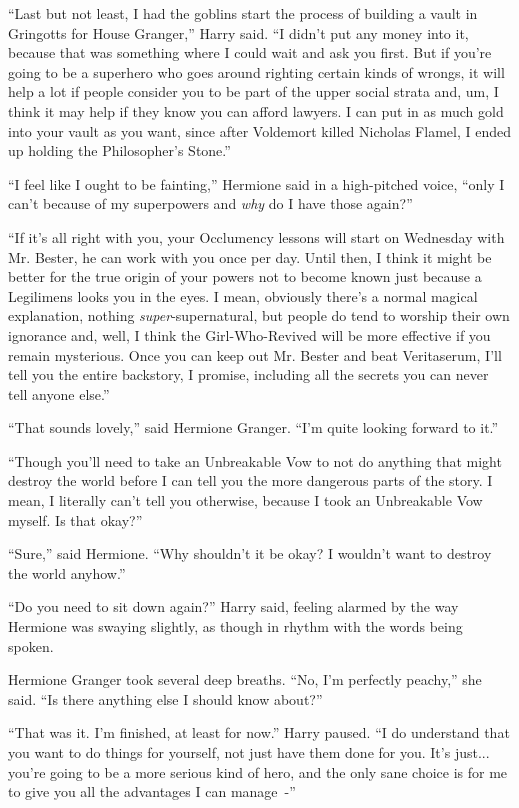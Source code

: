 ``Last but not least, I had the goblins start the process of building a vault in Gringotts for House Granger,'' Harry said. ``I didn't put any money into it, because that was something where I could wait and ask you first. But if you're going to be a superhero who goes around righting certain kinds of wrongs, it will help a lot if people consider you to be part of the upper social strata and, um, I think it may help if they know you can afford lawyers. I can put in as much gold into your vault as you want, since after Voldemort killed Nicholas Flamel, I ended up holding the Philosopher's Stone.''

``I feel like I ought to be fainting,'' Hermione said in a high-pitched voice, ``only I can't because of my superpowers and \emph{why} do I have those again?''

``If it's all right with you, your Occlumency lessons will start on Wednesday with Mr. Bester, he can work with you once per day. Until then, I think it might be better for the true origin of your powers not to become known just because a Legilimens looks you in the eyes. I mean, obviously there's a normal magical explanation, nothing \emph{super}-supernatural, but people do tend to worship their own ignorance and, well, I think the Girl-Who-Revived will be more effective if you remain mysterious. Once you can keep out Mr. Bester and beat Veritaserum, I'll tell you the entire backstory, I promise, including all the secrets you can never tell anyone else.''

``That sounds lovely,'' said Hermione Granger. ``I'm quite looking forward to it.''

``Though you'll need to take an Unbreakable Vow to not do anything that might destroy the world before I can tell you the more dangerous parts of the story. I mean, I literally can't tell you otherwise, because I took an Unbreakable Vow myself. Is that okay?''

``Sure,'' said Hermione. ``Why shouldn't it be okay? I wouldn't want to destroy the world anyhow.''

``Do you need to sit down again?'' Harry said, feeling alarmed by the way Hermione was swaying slightly, as though in rhythm with the words being spoken.

Hermione Granger took several deep breaths. ``No, I'm perfectly peachy,'' she said. ``Is there anything else I should know about?''

``That was it. I'm finished, at least for now.'' Harry paused. ``I do understand that you want to do things for yourself, not just have them done for you. It's just... you're going to be a more serious kind of hero, and the only sane choice is for me to give you all the advantages I can manage~-''

